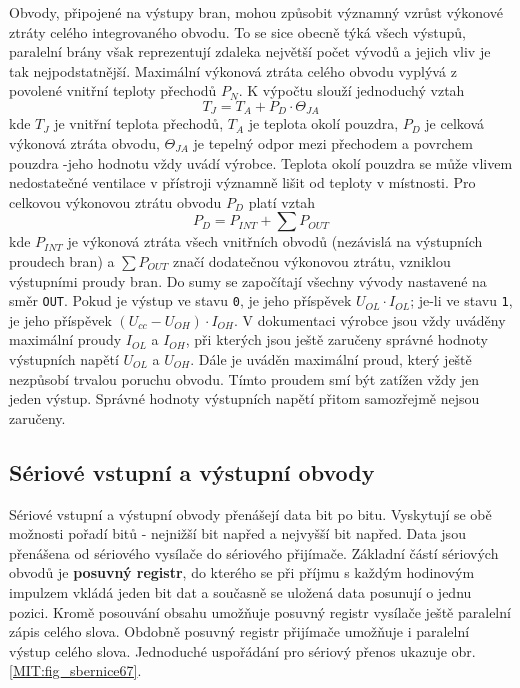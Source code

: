     Obvody, připojené na výstupy bran, mohou způsobit významný vzrůst výkonové ztráty celého 
    integrovaného obvodu. To se sice obecně týká všech výstupů, paralelní brány však reprezentují 
    zdaleka největší počet vývodů a jejich vliv je tak nejpodstatnější. Maximální výkonová ztráta 
    celého obvodu vyplývá z povolené vnitřní teploty přechodů \(P_N\). K výpočtu slouží jednoduchý 
    vztah
    \begin{equation*}
      T_J = T_A + P_D\cdot \varTheta_{JA}
    \end{equation*}
    kde \(T_J\) je vnitřní teplota přechodů, \(T_A\) je teplota okolí pouzdra, \(P_D\) je celková 
    výkonová ztráta obvodu, \(\varTheta_{JA}\) je tepelný odpor mezi přechodem a povrchem pouzdra 
    -jeho hodnotu vždy uvádí výrobce. Teplota okolí pouzdra se může vlivem nedostatečné ventilace v 
    přístroji významně lišit od teploty v místnosti. Pro celkovou výkonovou ztrátu obvodu \(P_D\) 
    platí vztah
    \begin{equation*}
      P_D = P_{INT} + \sum P_{OUT}
    \end{equation*}
    kde \(P_{INT}\) je výkonová ztráta všech vnitřních obvodů (nezávislá na výstupních proudech 
    bran) a \(\sum P_{OUT}\) značí dodatečnou výkonovou ztrátu, vzniklou výstupními proudy bran. Do 
    sumy se započítají všechny vývody nastavené na směr \texttt{OUT}. Pokud je výstup ve stavu 
    \texttt{0}, je jeho příspěvek \(U_{OL}\cdot I_{OL}\); je-li ve stavu \texttt{1}, je jeho 
    příspěvek \((U_{cc} - U_{OH}) \cdot I_{OH}\). V dokumentaci výrobce jsou vždy uváděny maximální 
    proudy \(I_{OL}\) a \(I_{OH}\), při kterých jsou ještě zaručeny správné hodnoty výstupních 
    napětí \(U_{OL}\) a \(U_{OH}\). Dále je uváděn maximální proud, který ještě nezpůsobí trvalou 
    poruchu obvodu. Tímto proudem smí být zatížen vždy jen jeden výstup. Správné hodnoty výstupních 
    napětí přitom samozřejmě nejsou zaručeny.
      
    \subsection{Sériové vstupní a výstupní obvody} 
      Sériové vstupní a výstupní obvody přenášejí data bit po bitu. Vyskytují se obě možnosti 
      pořadí bitů - nejnižší bit napřed a nejvyšší bit napřed. Data jsou přenášena od sériového 
      vysílače do sériového přijímače. Základní částí sériových obvodů je \textbf{posuvný registr}, 
      do kterého se při příjmu s každým hodinovým impulzem vkládá jeden bit dat a současně se 
      uložená data posunují o jednu pozici. Kromě posouvání obsahu umožňuje posuvný registr 
      vysílače ještě paralelní zápis celého slova. Obdobně posuvný registr přijímače umožňuje i 
      paralelní výstup celého slova. Jednoduché uspořádání pro sériový přenos ukazuje obr. 
      \ref{MIT:fig_sbernice67}.
    
